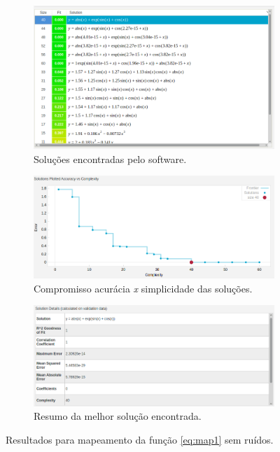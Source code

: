 	\begin{figure}[h!]
	
	\centering
	
		\begin{subfigure}{.45\textwidth} 
		  \centering
		  \includegraphics[width=1\linewidth]{aproximacao/solucoes_map1}
		  \caption{\centering Soluções encontradas pelo software.} 
		  \label{fig:map1_solucoes_s_ruido} 
		\end{subfigure}%
		\begin{subfigure}{.55\textwidth}
		  \centering
		  \includegraphics[width=1\linewidth]{aproximacao/pareto_map1}
		  \caption{\centering Compromisso acurácia \textit{x} simplicidade das
		  soluções.}
		  \label{fig:map1_pareto_s_ruido} 
		\end{subfigure}
	
		\begin{subfigure}{.65\textwidth}
		  \centering
		  \includegraphics[width=1\linewidth]{aproximacao/best_solucao_map1}
		  \caption{\centering Resumo da melhor solução encontrada.}
		  \label{fig:map1_best_s_ruido} 
		\end{subfigure}
	
	\caption{Resultados para mapeamento da função \ref{eq:map1} sem ruídos.}
	\end{figure}
	
